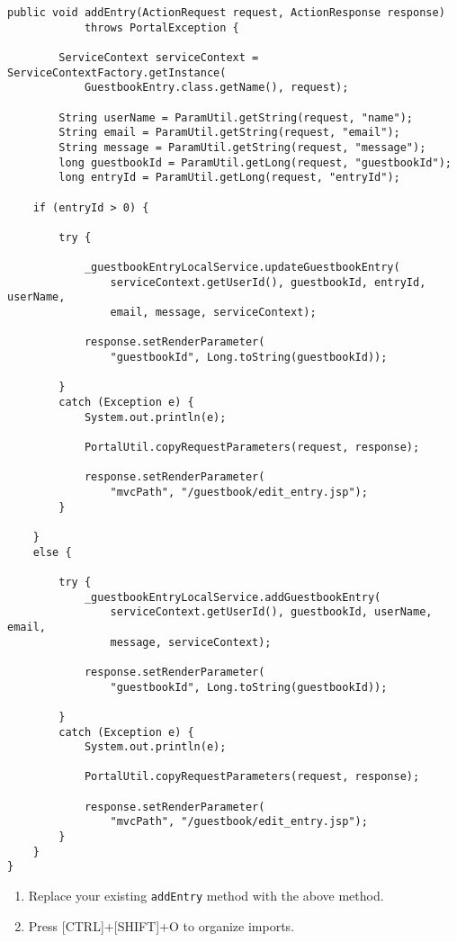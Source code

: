 \begin{verbatim}
public void addEntry(ActionRequest request, ActionResponse response)
            throws PortalException {

        ServiceContext serviceContext = ServiceContextFactory.getInstance(
            GuestbookEntry.class.getName(), request);

        String userName = ParamUtil.getString(request, "name");
        String email = ParamUtil.getString(request, "email");
        String message = ParamUtil.getString(request, "message");
        long guestbookId = ParamUtil.getLong(request, "guestbookId");
        long entryId = ParamUtil.getLong(request, "entryId");

    if (entryId > 0) {

        try {

            _guestbookEntryLocalService.updateGuestbookEntry(
                serviceContext.getUserId(), guestbookId, entryId, userName,
                email, message, serviceContext);

            response.setRenderParameter(
                "guestbookId", Long.toString(guestbookId));

        }
        catch (Exception e) {
            System.out.println(e);

            PortalUtil.copyRequestParameters(request, response);

            response.setRenderParameter(
                "mvcPath", "/guestbook/edit_entry.jsp");
        }

    }
    else {

        try {
            _guestbookEntryLocalService.addGuestbookEntry(
                serviceContext.getUserId(), guestbookId, userName, email,
                message, serviceContext);

            response.setRenderParameter(
                "guestbookId", Long.toString(guestbookId));

        }
        catch (Exception e) {
            System.out.println(e);

            PortalUtil.copyRequestParameters(request, response);

            response.setRenderParameter(
                "mvcPath", "/guestbook/edit_entry.jsp");
        }
    }
}
\end{verbatim}

\begin{enumerate}
\def\labelenumi{\arabic{enumi}.}
\item
  Replace your existing \texttt{addEntry} method with the above method.
\item
  Press {[}CTRL{]}+{[}SHIFT{]}+O to organize imports.
\end{enumerate}


